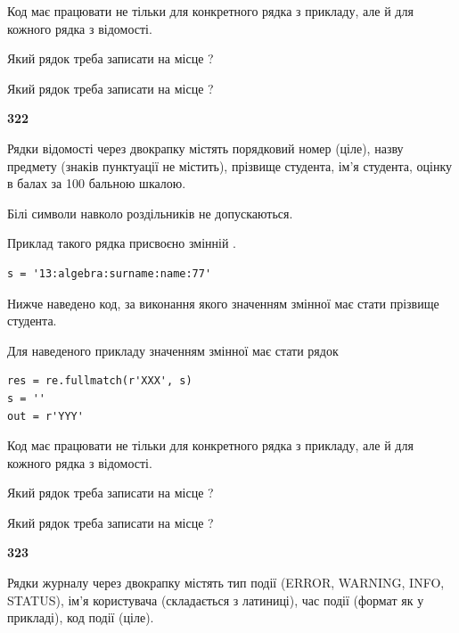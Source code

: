Код має працювати не тільки для конкретного рядка з прикладу, але й для кожного рядка з відомості.




Який рядок треба записати на місце  ?\par
\vspace{5mm}


Який рядок треба записати на місце  ?\par


\newpage

{\begin {center}\textbf{ 322}\end {center}}\par
Рядки відомості через двокрапку містять порядковий номер (ціле), назву предмету (знаків пунктуації не містить), прізвище студента, ім'я студента, оцінку в балах за 100 бальною шкалою.

Білі символи навколо роздільників не допускаються.

Приклад такого рядка присвоєно змінній .



\begin{verbatim}
s = '13:algebra:surname:name:77'
\end{verbatim}


Нижче наведено код, за виконання якого значенням змінної  має стати прізвище студента.

Для наведеного прикладу значенням змінної  має стати рядок 



\begin{verbatim}
res = re.fullmatch(r'XXX', s)
s = ''
out = r'YYY'
\end{verbatim}


Код має працювати не тільки для конкретного рядка з прикладу, але й для кожного рядка з відомості.




Який рядок треба записати на місце  ?\par
\vspace{5mm}


Який рядок треба записати на місце  ?\par


\newpage

{\begin {center}\textbf{ 323}\end {center}}\par
Рядки журналу через двокрапку містять тип події (ERROR, WARNING, INFO, STATUS), ім'я користувача (складається з латиниці), час події (фор\-мат як у прикладі), код події (ціле).

